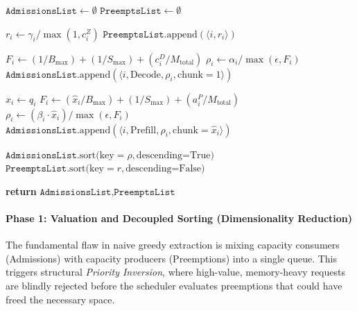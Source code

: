 \documentclass[11pt]{article}
\begin{document}
\begin{algorithm}[t]
\caption{Primal Phase 1: Valuation \& Decoupled Sorting (No Shadow Prices)}
\label{alg:primal_phase1}
\begin{algorithmic}[1]
    \State $\texttt{AdmissionsList} \gets \emptyset$
    \State $\texttt{PreemptsList} \gets \emptyset$
    
        \State {}
            \State $r_i \gets \gamma_i / \max(1, c_i^Z)$ 
            \State $\texttt{PreemptsList}.\text{append}(\langle i, r_i \rangle)$
        \EndIf
        
        \State {}
            \State {}
            \State $F_i \gets (1 / B_{\max}) + (1 / S_{\max}) + (c_i^D / M_{\text{total}})$
            \State $\rho_i \gets \alpha_i / \max(\epsilon, F_i)$ 
            \State $\texttt{AdmissionsList}.\text{append}(\langle i, \text{Decode}, \rho_i, \text{chunk}=1 \rangle)$
            
            \State {}
            \State $\hat{x}_i \gets q_i$ 
            \State \(F_i \gets (\hat{x}_i / B_{\max}) + (1 / S_{\max}) + (a_i^P / M_{\text{total}})\)
            \State $\rho_i \gets (\beta_i \cdot \hat{x}_i) / \max(\epsilon, F_i)$
            \State $\texttt{AdmissionsList}.\text{append}(\langle i, \text{Prefill}, \rho_i, \text{chunk}=\hat{x}_i \rangle)$
        \EndIf
    \EndFor
    
    \State {}
    \State $\texttt{AdmissionsList}.\text{sort(key}=\rho, \text{descending=True)}$ 
    \State $\texttt{PreemptsList}.\text{sort(key}=r, \text{descending=False)}$ 
    
    \State \textbf{return} $\texttt{AdmissionsList}, \texttt{PreemptsList}$
\EndProcedure
\end{algorithmic}
\end{algorithm}

\paragraph{Phase 1: Valuation and Decoupled Sorting (Dimensionality Reduction)}
The fundamental flaw in naive greedy extraction is mixing capacity consumers (Admissions) with capacity producers (Preemptions) into a single queue. This triggers structural \textit{Priority Inversion}, where high-value, memory-heavy requests are blindly rejected before the scheduler evaluates preemptions that could have freed the necessary space. 
\end{document}
